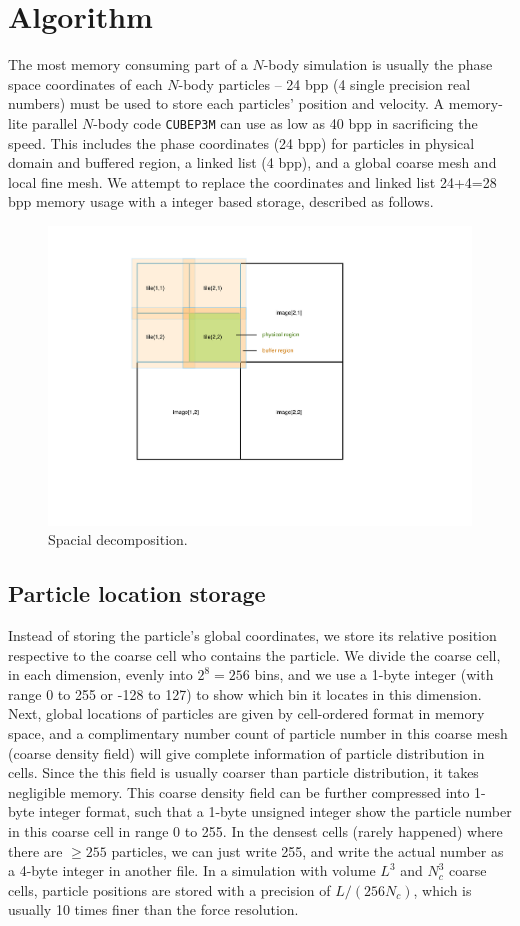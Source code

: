 \documentclass[10pt,twocolumn,preprint]{emulateapj}
\begin{document}
\section{Algorithm}
The most memory consuming part of a $N$-body simulation is usually the phase space coordinates of each $N$-body particles -- 24 bpp (4 single precision real numbers) must be used to store each particles' position and velocity. A memory-lite parallel $N$-body code {\tt CUBEP3M} can use as low as 40 bpp in sacrificing the speed. This includes the phase coordinates (24 bpp) for particles in physical domain and buffered region, a linked list (4 bpp), and a global coarse mesh and local fine mesh. We attempt to replace the coordinates and linked list 24+4=28 bpp memory usage with a integer based storage, described as follows.
\begin{figure}[t]
\centering
  \includegraphics[width=0.95\linewidth]{fig_tile.pdf}
 \caption{Spacial decomposition.}
\label{fig.tile}
\end{figure}

\subsection{Particle location storage}
Instead of storing the particle's global coordinates, we store its relative position respective to the coarse cell who contains the particle. We divide the coarse cell, in each dimension, evenly into $2^8=256$ bins, and we use a 1-byte integer (with range 0 to 255 or -128 to 127) to show which bin it locates in this dimension. Next, global locations of particles are given by cell-ordered format in memory space, and a complimentary number count of particle number in this coarse mesh (coarse density field) will give complete information of particle distribution in cells. Since the this field is usually coarser than particle distribution, it takes negligible memory. This coarse density field can be further compressed into 1-byte integer format, such that a 1-byte unsigned integer show the particle number in this coarse cell in range 0 to 255. In the densest cells (rarely happened) where there are $\ge 255$ particles, we can just write 255, and write the actual number as a 4-byte integer in another file. In a simulation with volume $L^3$ and $N_c^3$ coarse cells, particle positions are stored with a precision of $L/(256N_c)$, which is usually 10 times finer than the force resolution.
\end{document}
